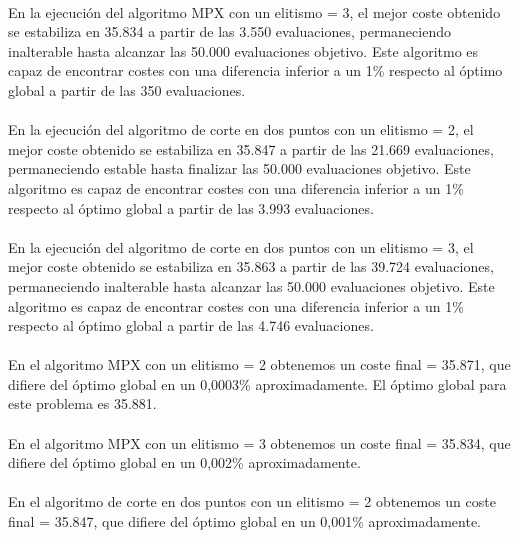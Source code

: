 	\paragraph{}En la ejecución del algoritmo MPX con un elitismo = 3, el mejor coste obtenido se estabiliza en 35.834 a partir de las 3.550 evaluaciones, permaneciendo inalterable hasta alcanzar las 50.000 evaluaciones objetivo. Este algoritmo es capaz de encontrar costes con una diferencia inferior a un 1\% respecto al óptimo global a partir de las 350 evaluaciones.
	
	\paragraph{}En la ejecución del algoritmo de corte en dos puntos con un elitismo = 2, el mejor coste obtenido se estabiliza en 35.847 a partir de las 21.669 evaluaciones, permaneciendo estable hasta finalizar las 50.000 evaluaciones objetivo. Este algoritmo es capaz de encontrar costes con una diferencia inferior a un 1\% respecto al óptimo global a partir de las 3.993 evaluaciones.
	
	\paragraph{}En la ejecución del algoritmo de corte en dos puntos con un elitismo = 3, el mejor coste obtenido se estabiliza en 35.863 a partir de las 39.724 evaluaciones, permaneciendo inalterable hasta alcanzar las 50.000 evaluaciones objetivo. Este algoritmo es capaz de encontrar costes con una diferencia inferior a un 1\% respecto al óptimo global a partir de las 4.746 evaluaciones.
	
	\paragraph{}En el algoritmo MPX con un elitismo = 2 obtenemos un coste final = 35.871, que difiere del óptimo global en un 0,0003\% aproximadamente. El óptimo global para este problema es 35.881.
	
	\paragraph{}En el algoritmo MPX con un elitismo = 3 obtenemos un coste final = 35.834, que difiere del óptimo global en un 0,002\% aproximadamente.
	
	\paragraph{}En el algoritmo de corte en dos puntos con un elitismo = 2 obtenemos un coste final = 35.847, que difiere del óptimo global en un 0,001\% aproximadamente.
	
